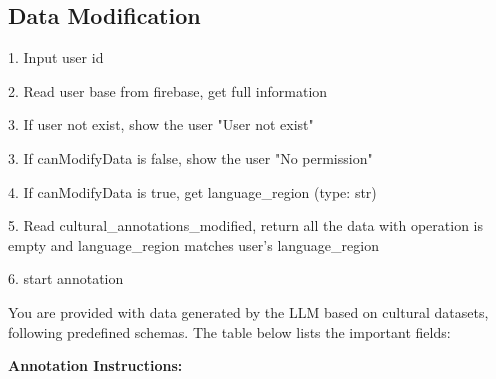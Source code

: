 \subsection{Data Modification}

1. Input user id

2. Read user base from firebase, get full information

3. If user not exist, show the user "User not exist"

3. If canModifyData is false, show the user "No permission"

4. If canModifyData is true, get language_region (type: str)

5. Read cultural_annotations_modified, return all the data with operation is empty and language_region matches user's language_region

6. start annotation

You are provided with data generated by the LLM based on cultural datasets, following predefined schemas. The table below lists the important fields:

\begin{table}[h]
\centering
{}
\caption{Schema fields in the provided dataset. These enforce consistency and structure across all data items.}
\label{tab:metadata_fields}
\end{table}

\textbf{Annotation Instructions:}


